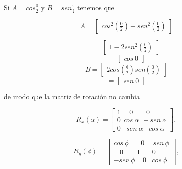 \documentclass[a4paper,10pt]{article}
\begin{document}
Si  $A =cos \frac{0}{2}$ y  $B =sen \frac{0}{2}$ tenemos que

\begin{equation}
A =
\left
[\begin{array}{lcr}
cos^2(\frac{0}{2})-sen^2(\frac{0}{2})
\end{array}\right]
\end{equation}

\begin{equation} 
=
\left
[\begin{array}{lcr}
1 - 2 sen^2 (\frac{0}{2})
\end{array}\right]
\end{equation}
\begin{equation}
=
\left
[\begin{array}{lcr}
cos \ 0
\end{array}
\right]
\end{equation}
\begin{equation}
B =
\left
[\begin{array}{lcr}
2cos  (\frac{0}{2}) sen(\frac{0}{2})
\end{array}\right]
\end{equation}
\begin{equation}
=
\left
[\begin{array}{lcr}
sen \ 0
\end{array}\right]
\end{equation}

de modo que la matriz de rotación no cambia

\begin{equation}
R_x(\alpha) =
\left
[\begin{array}{lcr}
1 \ \ \ \ \ \ 0 \ \ \ \ \ \ \ \ \ 0 \\ 0 \ \ cos \ \alpha \ \ -sen \ \alpha \\ 0 \ \ \ \ sen \ \alpha \ \ \ \ cos \ \alpha
\end{array}\right],
\end{equation}

\begin{equation}
R_y(\phi) =
\left
[\begin{array}{lcr}
cos \ \phi \ \ \ \ \ \ \ \ 0 \ \ \ \ \ \ sen \ \phi \\ \ \ \ \ 0 \ \ \ \ \ \ \ \ \ 1 \ \ \ \ \ \ \ \ 0 \\ -sen \ \phi \ \ \ \ \ 0 \ \ \ \ cos \ \phi
\end{array}\right],
\end{equation}
\end{document}

